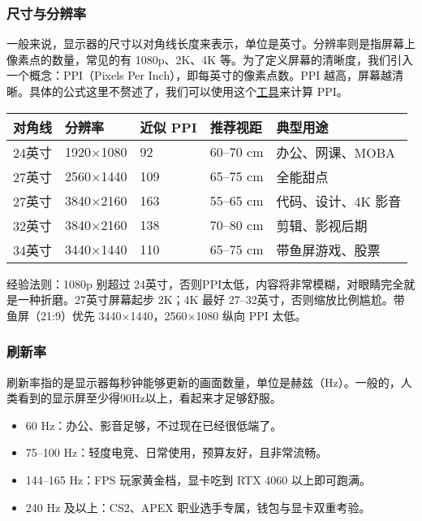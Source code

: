 \documentclass[../main.tex]{subfiles}
\begin{document}
\subsubsection{尺寸与分辨率}

一般来说，显示器的尺寸以对角线长度来表示，单位是英寸。分辨率则是指屏幕上像素点的数量，常见的有 1080p、2K、4K 等。为了定义屏幕的清晰度，我们引入一个概念：PPI（Pixels Per Inch），即每英寸的像素点数。PPI 越高，屏幕越清晰。具体的公式这里不赘述了，我们可以使用这个\href{https://config.net.cn/tools/PixelToPpi.html}{工具}来计算 PPI。

\begin{table}[ht]
  \centering
  \begin{tabular}{l|l|l|l|l}
    \hline
    对角线 & 分辨率 & 近似 PPI & 推荐视距 & 典型用途 \\
    \hline
    24英寸 & 1920$\times$1080 & 92 & 60–70 cm & 办公、网课、MOBA \\
    27英寸 & 2560$\times$1440 & 109 & 65–75 cm & 全能甜点 \\
    27英寸 & 3840$\times$2160 & 163 & 55–65 cm & 代码、设计、4K 影音 \\
    32英寸 & 3840$\times$2160 & 138 & 70–80 cm & 剪辑、影视后期 \\
    34英寸 & 3440$\times$1440 & 110 & 65–75 cm & 带鱼屏游戏、股票 \\
    \hline
  \end{tabular}
\end{table}

经验法则：1080p 别超过 24英寸，否则PPI太低，内容将非常模糊，对眼睛完全就是一种折磨。27英寸屏幕起步 2K；4K 最好 27–32英寸，否则缩放比例尴尬。带鱼屏（21:9）优先 3440$\times$1440，2560$\times$1080 纵向 PPI 太低。

\subsubsection{刷新率}

刷新率指的是显示器每秒钟能够更新的画面数量，单位是赫兹（Hz）。一般的，人类看到的显示屏至少得90Hz以上，看起来才足够舒服。

\begin{itemize}
  \item 60 Hz：办公、影音足够，不过现在已经很低端了。
  \item 75–100 Hz：轻度电竞、日常使用，预算友好，且非常流畅。
  \item 144–165 Hz：FPS 玩家黄金档，显卡吃到 RTX 4060 以上即可跑满。
  \item 240 Hz 及以上：CS2、APEX 职业选手专属，钱包与显卡双重考验。
\end{itemize}
\end{document}
